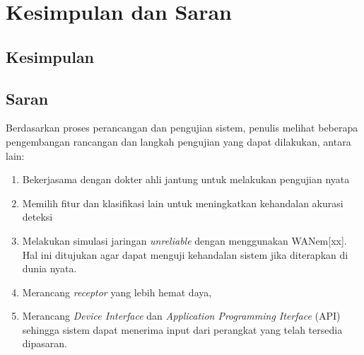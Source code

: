 \chapter{Kesimpulan dan Saran}
\section{Kesimpulan}

\section{Saran}
Berdasarkan proses perancangan dan pengujian sistem, penulis melihat beberapa pengembangan rancangan dan langkah pengujian yang dapat dilakukan, antara lain:
\begin{enumerate}
	\item Bekerjasama dengan dokter ahli jantung untuk melakukan pengujian nyata
	\item Memilih fitur dan klasifikasi lain untuk meningkatkan kehandalan akurasi deteksi	
	\item Melakukan simulasi jaringan \textit{unreliable} dengan menggunakan WANem[xx]. Hal ini ditujukan agar dapat menguji kehandalan sistem jika diterapkan di dunia nyata.
	\item Merancang \textit{receptor} yang lebih hemat daya,
	\item Merancang \textit{Device Interface} dan \textit{Application Programming Iterface} (API) sehingga sistem dapat menerima input dari perangkat yang telah tersedia dipasaran.
\end{enumerate}